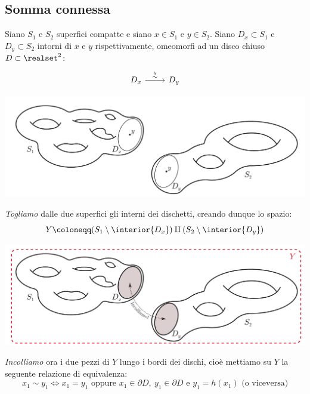 	\subsection{Somma connessa}
Siano $S_1$ e $S_2$ superfici compatte e siano $x\in S_1$ e $y\in S_2$. Siano $D_x\subset S_1$ e $D_y\subset S_2$ intorni di $x$ e $y$ rispettivamente, omeomorfi ad un disco chiuso $D\subset\realset^2$:
\[\begin{tikzcd}
	{D_x} & {D_y}
	\arrow["{\stackrel{h}{\sim}}", from=1-1, to=1-2]
\end{tikzcd}\]
\begin{center}
	\includegraphics[trim=0cm 0cm 0cm 0cm, clip, scale=0.4]{images/connectedsum1.pdf}
\end{center}
\textit{Togliamo} dalle due superfici gli interni dei dischetti, creando dunque lo spazio:
\begin{equation*}
	Y\coloneqq (S_1\setminus \interior{D_x})\amalg (S_2\setminus \interior{D_y})
\end{equation*}
\begin{center}
	\includegraphics[trim=0cm 0cm 0cm 0cm, clip, scale=0.4]{images/connectedsum2.pdf}
\end{center}
\textit{Incolliamo} ora i due pezzi di $Y$ lungo i bordi dei dischi, cioè mettiamo su $Y$ la seguente relazione di equivalenza:
\begin{equation*}
	x_1\sim y_1 \iff x_1=y_1\text{ oppure } x_1\in\partial{D},\ y_1\in\partial{D}\text{ e } y_1=h(x_1)\text{ (o viceversa)} 
\end{equation*}
